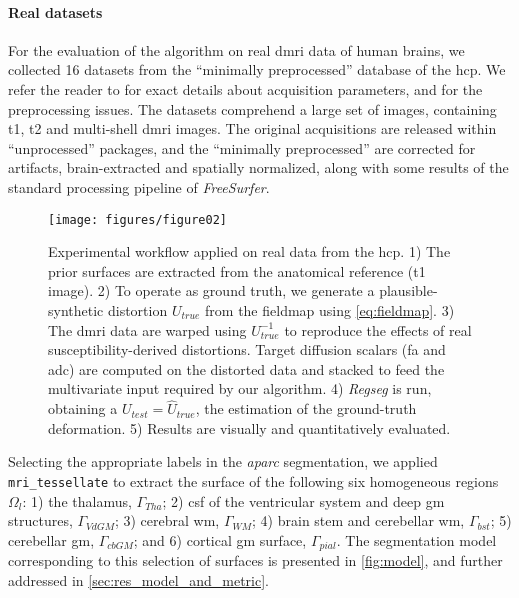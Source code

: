 \paragraph*{Real datasets} %
\label{sec:human_connectome}
%
For the evaluation of the algorithm on real \gls*{dmri} data of human brains,
  we collected 16 datasets from the ``minimally preprocessed''
	 database of the \gls*{hcp}.
We refer the reader to \citep{essen_human_2012} for exact details about acquisition
  parameters, and \citep{glasser_minimal_2013} for the preprocessing issues.
The datasets comprehend a large set of images, containing \gls*{t1}, \gls*{t2} and
  multi-shell \gls*{dmri} images.
The original acquisitions are released within ``unprocessed'' packages, and
  the ``minimally preprocessed'' are corrected for artifacts, brain-extracted
  and spatially normalized, along with some results of the standard processing
  pipeline of \emph{FreeSurfer}.

\begin{figure*}
\texttt{[image: figures/figure02]}
\caption{Experimental workflow applied on real data from the \acrfull*{hcp}.
  1) The prior surfaces are extracted from the anatomical reference (\gls*{t1} image).
  2) To operate as ground truth, we generate a plausible-synthetic distortion $U_{true}$
    from the fieldmap using \eqref{eq:fieldmap}.
  3) The \gls*{dmri} data are warped using $U^{-1}_{true}$ to reproduce the effects of real
    susceptibility-derived distortions.
  Target diffusion scalars (\gls*{fa} and \gls*{adc}) are computed on the distorted data and
    stacked to feed the multivariate input required by our algorithm.
  4) \emph{Regseg} is run, obtaining a $U_{test} = \hat{U}_{true}$, the estimation of
    the ground-truth deformation.
  5) Results are visually and quantitatively evaluated.}\label{fig:evworkflows}
\end{figure*}

Selecting the appropriate labels in the \emph{aparc} segmentation, we applied
  \texttt{mri\_tessellate} to extract the surface of the following
  six homogeneous regions $\Omega_l$:
  1) the thalamus, $\Gamma_{Tha}$;
  2) \gls*{csf} of the ventricular system and deep \gls*{gm} structures, $\Gamma_{VdGM}$;
  3) cerebral \gls*{wm}, $\Gamma_{WM}$;
  4) brain stem and cerebellar \gls*{wm}, $\Gamma_{bst}$;
	5) cerebellar \gls*{gm}, $\Gamma_{cbGM}$; and
	6) cortical \gls*{gm} surface, $\Gamma_{pial}$.
The segmentation model corresponding to this selection of surfaces is presented in
  \autoref{fig:model}, and further addressed in \autoref{sec:res_model_and_metric}.


